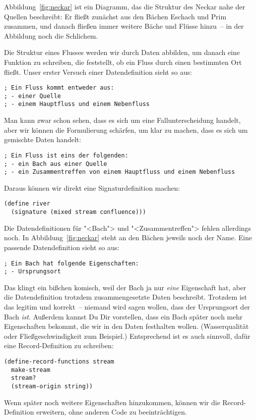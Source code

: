 \noindent Abbildung~\ref{fig:neckar} ist ein Diagramm, das die
Struktur des Neckar nahe der Quellen beschreibt: Er fließt zunächst
aus den Bächen Eschach und Prim zusammen, und danach fließen immer
weitere Bäche und Flüsse hinzu~-- in der Abbildung noch die
Schlichem.

Die Struktur eines Flusses werden wir durch Daten abbilden, um danach
eine Funktion zu schreiben, die feststellt, ob ein Fluss durch einen
bestimmten Ort fließt.  Unser erster Versuch einer Datendefinition
sieht so aus:
%
\begin{lstlisting}
; Ein Fluss kommt entweder aus:
; - einer Quelle
; - einem Hauptfluss und einem Nebenfluss
\end{lstlisting}
%
Man kann zwar schon sehen, dass es sich um eine Fallunterscheidung
handelt, aber wir können die Formulierung schärfen, um klar zu machen,
dass es sich um gemischte Daten handelt:
%
\begin{lstlisting}
; Ein Fluss ist eins der folgenden:
; - ein Bach aus einer Quelle
; - ein Zusammentreffen von einem Hauptfluss und einem Nebenfluss
\end{lstlisting}
%
Daraus können wir direkt eine Signaturdefinition machen:
%
\begin{lstlisting}
(define river
  (signature (mixed stream confluence)))
\end{lstlisting}
%
Die Datendefinitionen für "<Bach"> und "<Zusammentreffen"> fehlen
allerdings noch.  In Abbildung~\ref{fig:neckar} steht an den Bächen
jeweils noch der Name.  Eine passende Datendefinition sieht so aus:
%
\begin{lstlisting}
; Ein Bach hat folgende Eigenschaften:
; - Ursprungsort
\end{lstlisting}
%
Das klingt ein bißchen komisch, weil der Bach ja nur \emph{eine}
Eigenschaft hat, aber die Datendefinition trotzdem zusammengesetzte
Daten beschreibt.  Trotzdem ist das legitim und korrekt~-- niemand
wird sagen wollen, dass der Ursprungsort der Bach \emph{ist}.
Außerdem kannst Du Dir vorstellen, dass ein Bach später noch mehr
Eigenschaften bekommt, die wir in den Daten festhalten
wollen. (Wasserqualität oder Fließgeschwindigkeit zum Beispiel.)
Entsprechend ist es auch sinnvoll, dafür eine Record-Definition zu
schreiben:
%
\begin{lstlisting}
(define-record-functions stream
  make-stream
  stream?
  (stream-origin string))
\end{lstlisting}
%
Wenn später noch weitere Eigenschaften hinzukommen, können wir die
Record-Definition erweitern, ohne anderen Code zu beeinträchtigen.

